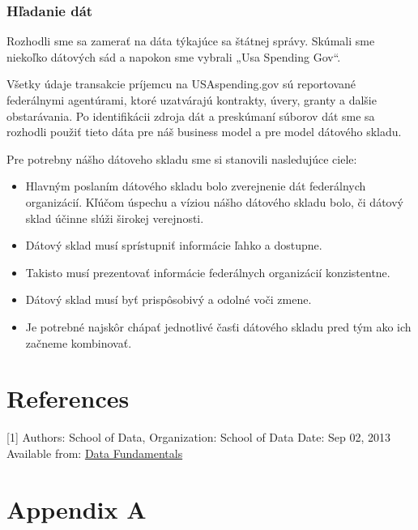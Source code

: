 \documentclass[letterpaper,12pt,oneside]{sphinxmanual}
\begin{document}
\subsection{Hľadanie dát}
\label{resume:hladanie-dat}
Rozhodli sme sa zamerať na dáta týkajúce sa štátnej správy. Skúmali sme niekoľko dátových sád a napokon sme vybrali „Usa Spending Gov“.

Všetky údaje transakcie príjemcu na USAspending.gov sú reportované federálnymi agentúrami, ktoré uzatvárajú kontrakty,
úvery, granty a dalšie obstarávania. Po identifikácii zdroja dát a preskúmaní súborov dát sme sa rozhodli použiť tieto
dáta pre náš business model a pre model dátového skladu.

Pre potrebny nášho dátoveho skladu sme si stanovili nasledujúce ciele:
\begin{itemize}
\item {} 
Hlavným poslaním dátového skladu bolo zverejnenie dát federálnych organizácií. Kľúčom úspechu a víziou nášho dátového skladu bolo, či dátový sklad účinne slúži širokej verejnosti.

\item {} 
Dátový sklad musí sprístupniť informácie ľahko a dostupne.

\item {} 
Takisto musí prezentovať informácie federálnych organizácií konzistentne.

\item {} 
Dátový sklad musí byť prispôsobivý a odolné voči zmene.

\item {} 
Je potrebné najskôr chápať jednotlivé časťi dátového skladu pred tým ako ich začneme kombinovať.

\end{itemize}


\chapter{References}
\label{references::doc}\label{references:references}
\label{references:id1}{[}1{]} Authors: School of Data, Organization: School of Data Date: Sep 02, 2013 Available from: \href{http://schoolofdata.org/handbook/courses/what-is-data/}{Data Fundamentals}




\chapter{Appendix A}
\label{apendixa::doc}\label{apendixa:appendix-a}
\end{document}
